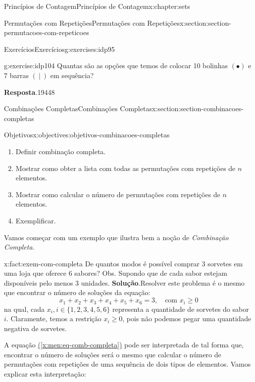 \documentclass[oneside,10pt,]{book}
\newcommand{\blocktitlefont}{\relax}
\newcommand{\xreffont}{\relax}
\numberwithin{equation}{section}
\begin{document}
\begin{chapterptx}{Princípios de Contagem}{}{Princípios de Contagem}{}{}{x:chapter:sets}
\begin{sectionptx}{Permutações com Repetições}{}{Permutações com Repetições}{}{}{x:section:section-permutacoes-com-repeticoes}
\begin{exercises-subsection}{Exercícios}{}{Exercícios}{}{}{g:exercises:idp95}
\begin{divisionexercise}{5}{}{}{g:exercise:idp104}%
Quantas são as opções que temos de colocar 10 bolinhas \((\bullet)\) e 7 barras \((~|~)\) em sequência?%
\par\smallskip%
\noindent\textbf{\blocktitlefont Resposta}.\hypertarget{g:answer:idp105}{}\quad{}19448%
\end{divisionexercise}%
\end{exercises-subsection}
\end{sectionptx}
%
%
\typeout{************************************************}
\typeout{************************************************}
%
\begin{sectionptx}{Combinações Completas}{}{Combinações Completas}{}{}{x:section:section-combinacoes-completas}
\begin{objectives}{Objetivos}{x:objectives:objetivos-combinacoes-completas}
%
\begin{enumerate}
\item{}Definir combinação completa.%
\item{}Mostrar como obter a lista com todas as permutações com repetições de \(n\) elementos.%
\item{}Mostrar como calcular o número de permutações com repetições de \(n\) elementos.%
\item{}Exemplificar.%
\end{enumerate}
\end{objectives}
Vamos começar com um exemplo que ilustra bem a noção de \emph{Combinação Completa}.%
\begin{fact}{}{}{x:fact:exem-com-completa}%
De quantos modos é possível comprar 3 sorvetes em uma loja que oferece 6 sabores? Obs. Supondo que de cada sabor estejam disponíveis pelo menos 3 unidades.%
\textbf{\blocktitlefont Solução}.\quad{}Resolver este problema é o mesmo que encontrar o número de soluções da equação:%
\begin{equation}
x_1 + x_2 + x_3 + x_4 + x_5 + x_6  = 3, ~~~ \text{ com }  x_i \geq 0 \label{x:men:eq-comb-completa}
\end{equation}
na qual, cada \(x_i, i\in\{1, 2, 3, 4, 5, 6\}\) representa a quantidade de sorvetes do sabor \(i\). Claramente, temos a restrição \(x_i\geq 0\), pois não podemos pegar uma quantidade negativa de sorvetes.%
\par
A equação \hyperref[x:men:eq-comb-completa]{({\xreffont\ref{x:men:eq-comb-completa}})} pode ser interpretada de tal forma que, encontrar o número de soluções será o mesmo que calcular o número de permutações com repetições de uma sequência de dois tipos de elementos. Vamos explicar esta interpretação:%

\end{fact}
\end{sectionptx}
\end{chapterptx}
\end{document}
